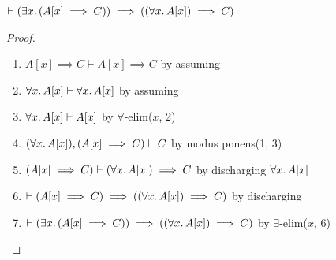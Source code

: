\begin{node}
$\vdash(\exists x\ldotp(A[x]\implies C))\implies((\forall x\ldotp A[x])\implies C)$
\end{node}

\begin{proof}
\begin{enumerate}
\item $A[x]\implies C\vdash A[x]\implies C$
  by assuming%
\item $\forall x\ldotp A[x]\vdash\forall x\ldotp A[x]$ by assuming%
\item $\forall x\ldotp A[x]\vdash A[x]$ by $\forall$-elim($x$, 2)%
\item $(\forall x\ldotp A[x]),(A[x]\implies C)\vdash C$
  by modus ponens(1, 3)%
\item $(A[x]\implies C)\vdash(\forall x\ldotp A[x])\implies C$
  by discharging $\forall x\ldotp A[x]$%
\item $\vdash(A[x]\implies C)\implies((\forall x\ldotp A[x])\implies C)$
  by discharging%
\item $\vdash(\exists x\ldotp(A[x]\implies C))\implies((\forall x\ldotp A[x])\implies C)$
  by $\exists$-elim($x$, 6)\qedhere
\end{enumerate}
\end{proof}

